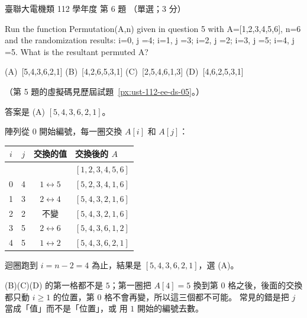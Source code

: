 \begin{pastexam}[label={px:ust-112-ee-ds-06}]{臺聯大電機類 112 學年度 第 6 題}
（單選；3 分）

Run the function Permutation(A,n) given in question 5 with A=[1,2,3,4,5,6], n=6 and the
randomization results: i=0, j =4; i=1, j =3; i=2, j =2; i=3, j =5; i=4, j =5. What is the
resultant permuted A?

(A)~[5,4,3,6,2,1] \qquad (B)~[4,2,6,5,3,1] \qquad (C)~[2,5,4,6,1,3] \qquad (D)~[4,6,2,5,3,1]

（第 5 題的虛擬碼見歷屆試題~\ref{px:ust-112-ee-ds-05}。）
\end{pastexam}

\begin{pastsoln}
答案是 (A) $[5, 4, 3, 6, 2, 1]$。

陣列從 $0$ 開始編號，每一圈交換 $A[i]$ 和 $A[j]$：
\begin{center}
\begin{tabular}{cccl}
\toprule
$i$ & $j$ & 交換的值 & 交換後的 $A$ \\
\midrule
  &   &         & $[1, 2, 3, 4, 5, 6]$ \\
0 & 4 & $1 \leftrightarrow 5$ & $[5, 2, 3, 4, 1, 6]$ \\
1 & 3 & $2 \leftrightarrow 4$ & $[5, 4, 3, 2, 1, 6]$ \\
2 & 2 & 不變 & $[5, 4, 3, 2, 1, 6]$ \\
3 & 5 & $2 \leftrightarrow 6$ & $[5, 4, 3, 6, 1, 2]$ \\
4 & 5 & $1 \leftrightarrow 2$ & $[5, 4, 3, 6, 2, 1]$ \\
\bottomrule
\end{tabular}
\end{center}
迴圈跑到 $i = n - 2 = 4$ 為止，結果是 $[5, 4, 3, 6, 2, 1]$，選 (A)。

(B)(C)(D) 的第一格都不是 $5$；第一圈把 $A[4] = 5$ 換到第 $0$ 格之後，後面的交換都只動 $i \ge 1$
的位置，第 $0$ 格不會再變，所以這三個都不可能。 常見的錯是把 $j$ 當成「值」而不是「位置」，或
用 $1$ 開始的編號去數。
\end{pastsoln}
